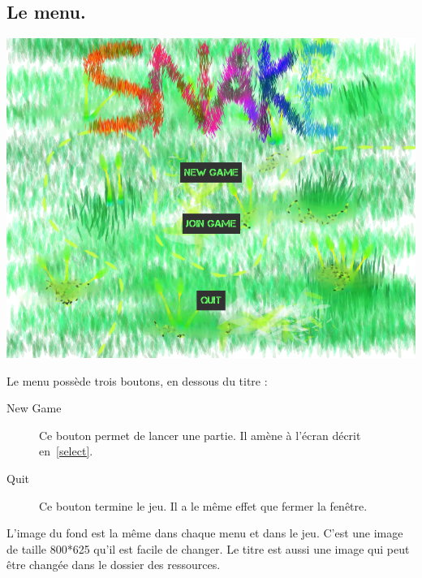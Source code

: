 \documentclass{article}
\begin{document}
\subsection{Le menu.} \label{menu}
\begin{center}
	\includegraphics[scale=0.4]{img/menu.png}
\end{center}
Le menu possède trois boutons, en dessous du titre :
\begin{description}
	\item[New Game] Ce bouton permet de lancer une partie. Il amène à l'écran décrit en~\ref{select}.
	\item[Quit] Ce bouton termine le jeu. Il a le même effet que fermer la fenêtre.
\end{description}

L'image du fond est la même dans chaque menu et dans le jeu. C'est une image de taille 800*625 qu'il est facile de changer. Le titre est aussi une image qui peut être changée dans le dossier des ressources.
\end{document}
